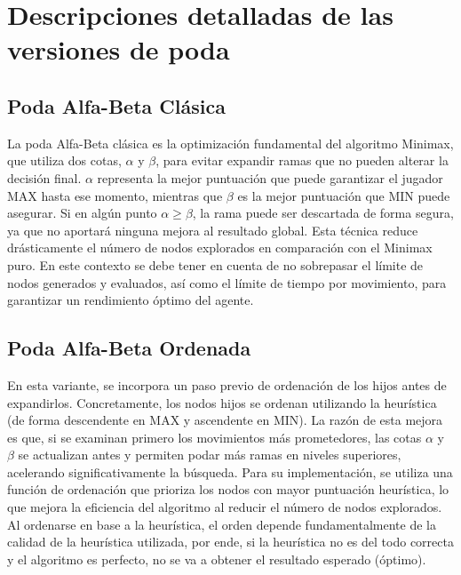 \chapter*{Descripciones detalladas de las versiones de poda}

\section*{Poda Alfa-Beta Clásica}
La poda Alfa-Beta clásica es la optimización fundamental del algoritmo Minimax, que utiliza dos cotas, $\alpha$ y $\beta$, para evitar expandir ramas que no pueden alterar la decisión final. $\alpha$ representa la mejor puntuación que puede garantizar el jugador MAX hasta ese momento, mientras que $\beta$ es la mejor puntuación que MIN puede asegurar. Si en algún punto $\alpha \geq \beta$, la rama puede ser descartada de forma segura, ya que no aportará ninguna mejora al resultado global. Esta técnica reduce drásticamente el número de nodos explorados en comparación con el Minimax puro. En este contexto se debe tener en cuenta de no sobrepasar el límite de nodos generados y evaluados, así como el límite de tiempo por movimiento, para garantizar un rendimiento óptimo del agente.

\section*{Poda Alfa-Beta Ordenada}
En esta variante, se incorpora un paso previo de ordenación de los hijos antes de expandirlos. Concretamente, los nodos hijos se ordenan utilizando la heurística (de forma descendente en MAX y ascendente en MIN). La razón de esta mejora es que, si se examinan primero los movimientos más prometedores, las cotas $\alpha$ y $\beta$ se actualizan antes y permiten podar más ramas en niveles superiores, acelerando significativamente la búsqueda. Para su implementación, se utiliza una función de ordenación que prioriza los nodos con mayor puntuación heurística, lo que mejora la eficiencia del algoritmo al reducir el número de nodos explorados. Al ordenarse en base a la heurística, el orden depende fundamentalmente de la calidad de la heurística utilizada, por ende, si la heurística no es del todo correcta y el algoritmo es perfecto, no se va a obtener el resultado esperado (óptimo).

